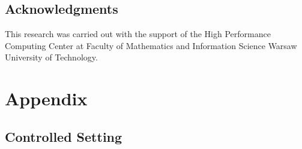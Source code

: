 \documentclass[a4paper,11pt,twoside]{report}
\theoremstyle{definition}
\begin{document}
\printbibliography

\section*{Acknowledgments}

This research was carried out with the support of the High Performance Computing Center at Faculty of Mathematics and Information Science Warsaw University of Technology.

\newpage

\chapter*{Appendix}

\section*{Controlled Setting}
\end{document}
